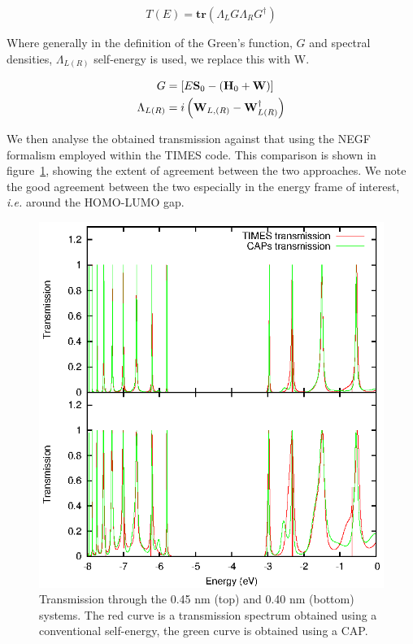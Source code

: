 \begin{equation}
	T(E) = \mathbf{tr}(\Lambda_L G \Lambda_R G^\dagger)	
	\label{eq:transmission}
\end{equation}

Where generally in the definition of the Green's function, $G$ and spectral
densities, $\Lambda_{L(R)}$ self-energy is used, we replace this with W.

\begin{subequations}
\begin{align}
	G &= [E\mathbf{S}_0 - (\mathbf{H}_0 + \mathbf{W})] \\
	\Lambda_{L(R)} &= i \left( \mathbf{W}_{L,(R)}
	                  - \mathbf{W}^\dagger_{L(R)} \right)
\end{align}
\label{eq:glambdadef}
\end{subequations}

We then analyse the obtained transmission against that using the NEGF formalism
employed within the TIMES code. This comparison is shown in
figure~\ref{fig:transdat}, showing the extent of agreement between the two
approaches. We note the good agreement between the two especially in the energy
frame of interest, \textit{i.e.} around the \ac{HOMO}-\ac{LUMO} gap.

\begin{figure} 
	\begin{center}
		\includegraphics[width=0.9\linewidth]{figures/transdat.eps}
	\end{center}
	\caption{Transmission through the 0.45 nm (top) and 0.40 nm (bottom)
	         systems. The red curve is a transmission spectrum obtained
		 using a conventional self-energy, the green curve is obtained
		 using a \ac{CAP}.}
	\label{fig:transdat}
\end{figure}

